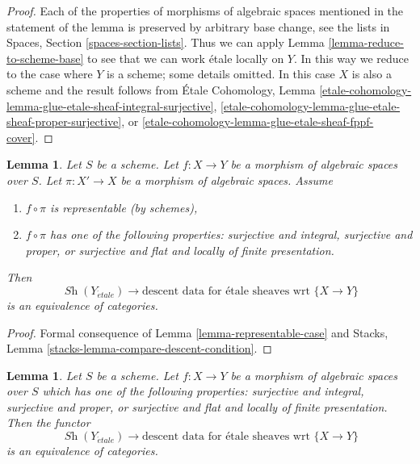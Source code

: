 \documentclass{stacks-project}
\theoremstyle{plain}
\newtheorem{lemma}[subsection]{Lemma}
\theoremstyle{definition}
\theoremstyle{remark}
\numberwithin{equation}{subsection}
\def\Sh{\mathop{\mathit{Sh}}\nolimits}
\def\etale{{\acute{e}tale}}
\begin{document}
\begin{proof}
Each of the properties of morphisms of algebraic spaces
mentioned in the statement of the lemma is preserved by
arbitrary base change, see the lists in
Spaces, Section \ref{spaces-section-lists}.
Thus we can apply Lemma \ref{lemma-reduce-to-scheme-base}
to see that we can work \'etale locally on $Y$.
In this way we reduce to the case where $Y$ is a scheme;
some details omitted. In this case $X$ is also a scheme
and the result follows from \'Etale Cohomology, Lemma
\ref{etale-cohomology-lemma-glue-etale-sheaf-integral-surjective},
\ref{etale-cohomology-lemma-glue-etale-sheaf-proper-surjective}, or
\ref{etale-cohomology-lemma-glue-etale-sheaf-fppf-cover}.
\end{proof}

\begin{lemma}
\label{lemma-reduce-to-scheme-source}
Let $S$ be a scheme. Let $f : X \to Y$ be a morphism of algebraic spaces
over $S$. Let $\pi : X' \to X$ be a morphism of algebraic spaces. Assume
\begin{enumerate}
\item $f \circ \pi$ is representable (by schemes),
\item $f \circ \pi$ has one of the following properties:
surjective and integral,
surjective and proper, or
surjective and flat and locally of finite presentation.
\end{enumerate}
Then 
$$
\Sh(Y_\etale)
\longrightarrow
\text{descent data for \'etale sheaves wrt }\{X \to Y\}
$$
is an equivalence of categories.
\end{lemma}

\begin{proof}
Formal consequence of Lemma \ref{lemma-representable-case}
and Stacks, Lemma \ref{stacks-lemma-compare-descent-condition}.
\end{proof}

\begin{lemma}
\label{lemma-glue-etale-sheaf-proper-surjective}
Let $S$ be a scheme. Let $f : X \to Y$ be a morphism of
algebraic spaces over $S$ which has one of the following
properties: surjective and integral, surjective and proper, or
surjective and flat and locally of finite presentation. Then the functor
$$
\Sh(Y_\etale)
\longrightarrow
\text{descent data for \'etale sheaves wrt }\{X \to Y\}
$$
is an equivalence of categories.
\end{lemma}
\end{document}
